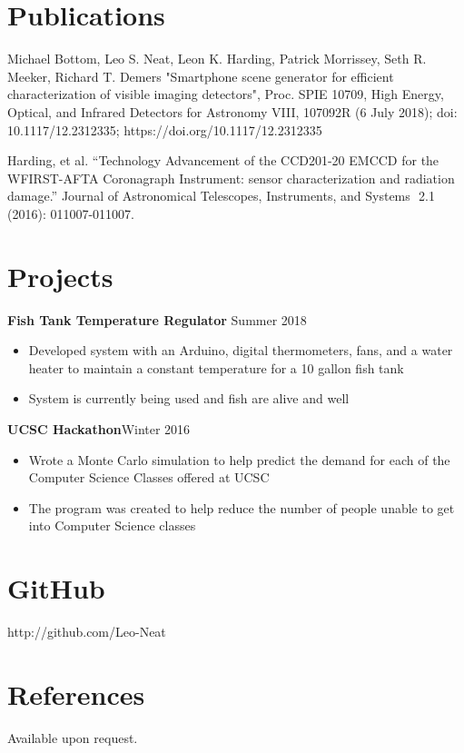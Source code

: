 \documentclass[mm,line]{res}
\begin{document}
\begin{resume}
\section{\sc Publications}
Michael Bottom, Leo S. Neat, Leon K. Harding, Patrick Morrissey, Seth R. Meeker, Richard T. Demers  "Smartphone scene generator for efficient characterization of visible imaging detectors", Proc. SPIE 10709, High Energy, Optical, and Infrared Detectors for Astronomy VIII, 107092R (6 July 2018); doi: 10.1117/12.2312335; https://doi.org/10.1117/12.2312335

 Harding, et al.  ``Technology Advancement of the CCD201-20 EMCCD for the WFIRST-AFTA Coronagraph Instrument: sensor characterization and radiation damage.'' Journal of Astronomical Telescopes, Instruments,  and Systems 
	​ 2.1 (2016): 011007-011007. 
\section{\sc Projects}
{\bf Fish Tank Temperature Regulator } \hfill {Summer 2018}
\begin{itemize}
	\item Developed system with an Arduino, digital thermometers, fans, and a water heater to maintain a constant temperature for a 10 gallon fish tank
	\item System is currently being used and fish are alive and well
\end{itemize}
{\bf UCSC Hackathon}\hfill {Winter 2016}
\begin{itemize}
\item Wrote a Monte Carlo simulation to help predict the demand for each of the Computer Science Classes offered at UCSC
\item The program was created to help reduce the number of people unable to get into Computer Science classes 
\end{itemize}



\section{\sc GitHub}
http://github.com/Leo-Neat



\section{\sc References }
Available upon request.

\end{resume}
\end{document}
